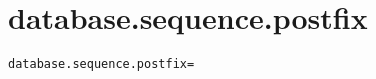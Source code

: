 \section{database.sequence.postfix}
\label{configuration:DatabaseSequencePostfix}
\AvailableInJavaOnly{\TODO}
\begin{lstlisting}[style=Props,caption={Usage example for \textit{database.sequence.postfix}}]
database.sequence.postfix=
\end{lstlisting}